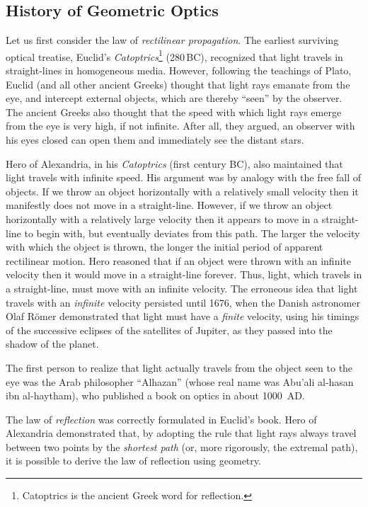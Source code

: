 \subsection{History of Geometric Optics}
Let us first consider the law of {\em rectilinear propagation}. 
The earliest surviving optical treatise, Euclid's 
{\em Catoptrics}\footnote{Catoptrics is the ancient
Greek word for reflection.}
 (280\,BC),
recognized that light travels in straight-lines  in homogeneous media. 
However, following the teachings of Plato, Euclid (and all other ancient
Greeks) thought that  light rays  emanate from the eye, and 
intercept external objects, which are thereby  ``seen'' by the observer. 
The ancient Greeks also thought that the speed with which light
rays emerge from the eye is very high, if not infinite. After all,
they argued,
an observer with his eyes closed can open them and immediately
see the distant stars. 

Hero of Alexandria, in his {\em Catoptrics}\/ (first century BC), 
also maintained
that light travels with infinite speed. His argument was by analogy with
the free fall of objects. If we throw an object horizontally with a
relatively small velocity then it manifestly does not move in a
straight-line. However, if we throw an object horizontally with a
relatively large velocity then it appears to move in
a straight-line to begin with, but eventually deviates from this
path. The larger the velocity with which the object is thrown, the longer
the initial period of apparent rectilinear motion. Hero reasoned that
 if
an object were thrown with an infinite velocity then it would move in
a straight-line forever. Thus, light, which travels in a straight-line,
must move with an infinite velocity. The erroneous idea that light 
travels with
an {\em infinite}\/
 velocity persisted until 1676, when
 the
Danish astronomer Olaf R\"{o}mer demonstrated that light must have a
{\em  finite}\/
velocity, using his   timings
of the successive  eclipses of the satellites of Jupiter, as they passed
 into the
shadow of the planet. 

The first person to realize that light actually travels
from the object seen to the eye was the Arab philosopher
``Alhazan'' (whose real name was Abu'ali al-hasan ibn al-haytham),
who published a book on optics in about 1000~AD.

The law of {\em reflection}\/ was correctly formulated in Euclid's book. 
Hero of Alexandria demonstrated that, by adopting the rule that light 
rays
always travel between two points by the {\em shortest path} (or, more 
rigorously,
the extremal path), it is possible to derive the law of reflection 
using geometry.


